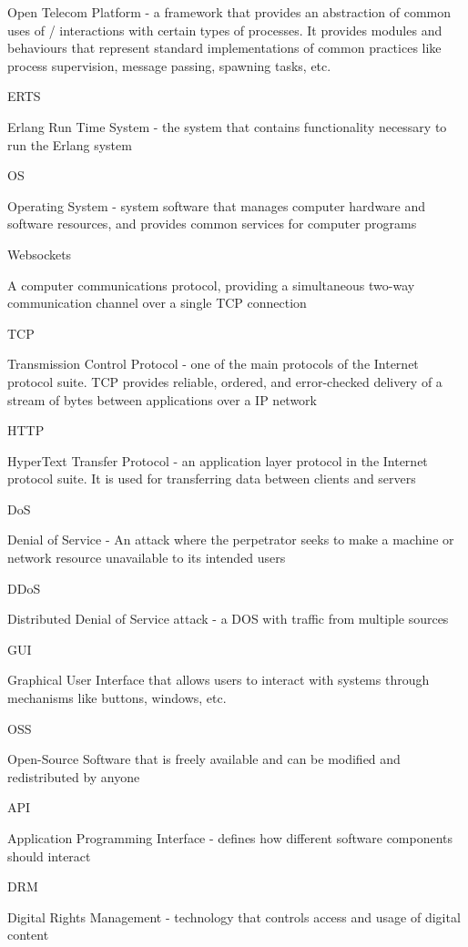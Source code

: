 \documentclass[]{interim}
\begin{document}
Open Telecom Platform - a framework that provides an abstraction of common uses of / interactions with
certain types of processes. It provides modules and behaviours that represent standard implementations of
common practices like process supervision, message passing, spawning tasks, etc.

ERTS

Erlang Run Time System - the system that contains functionality necessary to run the Erlang system

OS

Operating System - system software that manages computer hardware and software resources, and
provides common services for computer programs

Websockets

A computer communications protocol, providing a simultaneous two-way communication channel
over a single TCP connection

TCP

Transmission Control Protocol - one of the main protocols of the Internet protocol suite. TCP provides
reliable, ordered, and error-checked delivery of a stream of bytes between applications over a IP network

HTTP

HyperText Transfer Protocol - an application layer protocol in the Internet protocol suite.
It is used for transferring data between clients and servers

DoS

Denial of Service - An attack where the perpetrator seeks to make a machine or network resource unavailable
to its intended users

DDoS

Distributed Denial of Service attack - a DOS with traffic from multiple sources

GUI

Graphical User Interface that allows users to interact with systems through mechanisms like buttons, windows, etc.

OSS

Open-Source Software that is freely available and can be modified and redistributed by anyone

API

Application Programming Interface - defines how different software components should interact

DRM

Digital Rights Management - technology that controls access and usage of digital content
\end{document}

